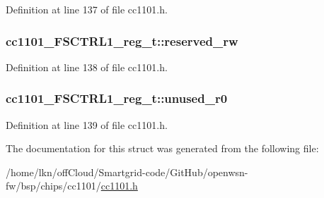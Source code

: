 Definition at line 137 of file cc1101.\+h.

\subsubsection[{\texorpdfstring{reserved\+\_\+rw}{reserved_rw}}]{ cc1101\+\_\+\+F\+S\+C\+T\+R\+L1\+\_\+reg\+\_\+t\+::reserved\+\_\+rw}\hypertarget{structcc1101___f_s_c_t_r_l1__reg__t_afd37250a51986607b49a8e6cd5477655}{}\label{structcc1101___f_s_c_t_r_l1__reg__t_afd37250a51986607b49a8e6cd5477655}


Definition at line 138 of file cc1101.\+h.

\subsubsection[{\texorpdfstring{unused\+\_\+r0}{unused_r0}}]{ cc1101\+\_\+\+F\+S\+C\+T\+R\+L1\+\_\+reg\+\_\+t\+::unused\+\_\+r0}\hypertarget{structcc1101___f_s_c_t_r_l1__reg__t_a763c9a7160816113690d8fe2418cc921}{}\label{structcc1101___f_s_c_t_r_l1__reg__t_a763c9a7160816113690d8fe2418cc921}


Definition at line 139 of file cc1101.\+h.



The documentation for this struct was generated from the following file\+:\begin{DoxyCompactItemize}
\item 
/home/lkn/off\+Cloud/\+Smartgrid-\/code/\+Git\+Hub/openwsn-\/fw/bsp/chips/cc1101/\hyperlink{cc1101_8h}{cc1101.\+h}\end{DoxyCompactItemize}
